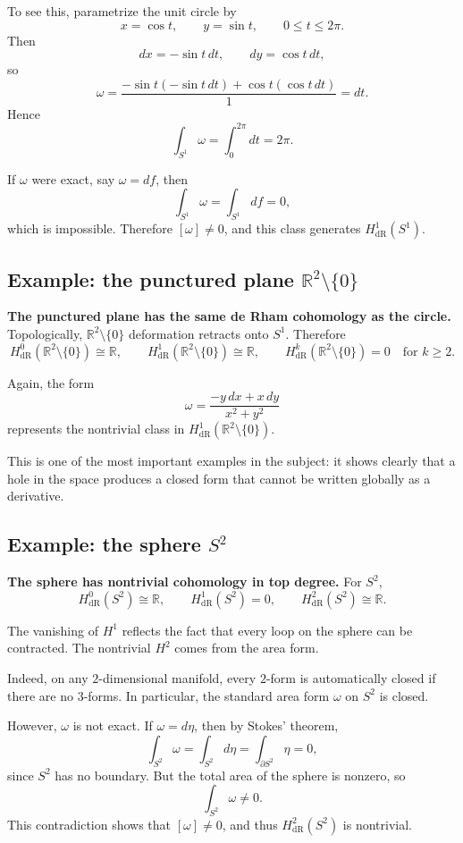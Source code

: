 \documentclass[12pt,a4paper]{article}
\theoremstyle{notespace}
\begin{document}
To see this, parametrize the unit circle by
\[
x=\cos t,\qquad y=\sin t,\qquad 0\le t\le 2\pi.
\]
Then
\[
dx=-\sin t\,dt,\qquad dy=\cos t\,dt,
\]
so
\[
\omega
=
\frac{-\sin t(-\sin t\,dt)+\cos t(\cos t\,dt)}{1}
=
dt.
\]
Hence
\[
\int_{S^1}\omega=\int_0^{2\pi}dt=2\pi.
\]

If \(\omega\) were exact, say \(\omega=df\), then
\[
\int_{S^1}\omega=\int_{S^1}df=0,
\]
which is impossible. Therefore \([\omega]\neq 0\), and this class generates \(H^1_{\mathrm{dR}}(S^1)\).

\subsection{Example: the punctured plane \(\mathbb{R}^2\setminus\{0\}\)}

\textbf{The punctured plane has the same de Rham cohomology as the circle.} Topologically, \(\mathbb{R}^2\setminus\{0\}\) deformation retracts onto \(S^1\). Therefore
\[
H^0_{\mathrm{dR}}(\mathbb{R}^2\setminus\{0\})\cong \mathbb{R},
\qquad
H^1_{\mathrm{dR}}(\mathbb{R}^2\setminus\{0\})\cong \mathbb{R},
\qquad
H^k_{\mathrm{dR}}(\mathbb{R}^2\setminus\{0\})=0
\quad\text{for }k\ge 2.
\]

Again, the form
\[
\omega=\frac{-y\,dx+x\,dy}{x^2+y^2}
\]
represents the nontrivial class in \(H^1_{\mathrm{dR}}(\mathbb{R}^2\setminus\{0\})\).

This is one of the most important examples in the subject: it shows clearly that a hole in the space produces a closed form that cannot be written globally as a derivative.

\subsection{Example: the sphere \(S^2\)}

\textbf{The sphere has nontrivial cohomology in top degree.} For \(S^2\),
\[
H^0_{\mathrm{dR}}(S^2)\cong \mathbb{R},
\qquad
H^1_{\mathrm{dR}}(S^2)=0,
\qquad
H^2_{\mathrm{dR}}(S^2)\cong \mathbb{R}.
\]

The vanishing of \(H^1\) reflects the fact that every loop on the sphere can be contracted. The nontrivial \(H^2\) comes from the area form.

Indeed, on any \(2\)-dimensional manifold, every \(2\)-form is automatically closed if there are no \(3\)-forms. In particular, the standard area form \(\omega\) on \(S^2\) is closed.

However, \(\omega\) is not exact. If \(\omega=d\eta\), then by Stokes' theorem,
\[
\int_{S^2}\omega=\int_{S^2}d\eta=\int_{\partial S^2}\eta=0,
\]
since \(S^2\) has no boundary. But the total area of the sphere is nonzero, so
\[
\int_{S^2}\omega\neq 0.
\]
This contradiction shows that \([\omega]\neq 0\), and thus \(H^2_{\mathrm{dR}}(S^2)\) is nontrivial.
\end{document}
